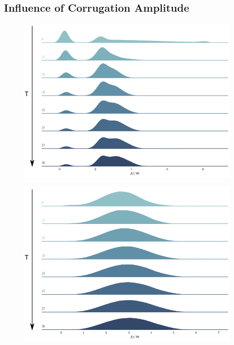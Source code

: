 

\subsection*{Influence of Corrugation Amplitude}


\begin{figure}
\centering
\includegraphics{plots/drop_stats/small_amp.pdf}
	\caption{\blindtext}
\label{tseries_small}
\end{figure}

\begin{figure}
\centering
\includegraphics{plots/drop_stats/large_amp.pdf}
	\caption{\blindtext}
\label{tseries_large}
\end{figure}

